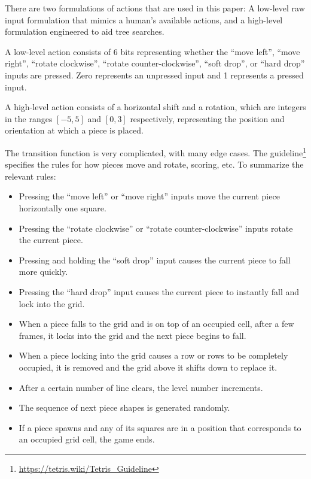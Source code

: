 \documentclass[letterpaper]{article} %
\begin{document}
There are two formulations of actions that are used in this paper: A low-level raw input formulation that mimics a human's available actions, and a high-level formulation engineered to aid tree searches.

A low-level action consists of 6 bits representing whether the ``move left'', ``move right'', ``rotate clockwise'', ``rotate counter-clockwise'', ``soft drop'', or ``hard drop'' inputs are pressed. Zero represents an unpressed input and 1 represents a pressed input.

A high-level action consists of a horizontal shift and a rotation, which are integers in the ranges \([-5,5]\) and \([0,3]\) respectively, representing the position and orientation at which a piece is placed.

The transition function is very complicated, with many edge cases. The \tetris{} guideline\footnote{\url{https://tetris.wiki/Tetris_Guideline}} specifies the rules for how pieces move and rotate, scoring, etc. To summarize the relevant rules:

\begin{itemize}
  \item{
        Pressing the ``move left'' or ``move right'' inputs move the current piece horizontally one square.
        }
  \item{
        Pressing the ``rotate clockwise'' or ``rotate counter-clockwise'' inputs rotate the current piece.
        }
  \item{
        Pressing and holding the ``soft drop'' input causes the current piece to fall more quickly.
        }
  \item{
        Pressing the ``hard drop'' input causes the current piece to instantly fall and lock into the grid.
        }
  \item{
        When a piece falls to the grid and is on top of an occupied cell, after a few frames, it locks into the grid and the next piece begins to fall.
        }
  \item{
        When a piece locking into the grid causes a row or rows to be completely occupied, it is removed and the grid above it shifts down to replace it.
        }
  \item{
        After a certain number of line clears, the level number increments.
        }
  \item{
        The sequence of next piece shapes is generated randomly.
        }
  \item{
        If a piece spawns and any of its squares are in a position that corresponds to an occupied grid cell, the game ends.
        }
\end{itemize}
\end{document}
